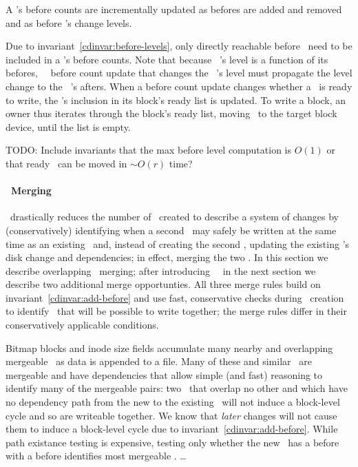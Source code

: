 A \chdesc{}'s before counts are incrementally updated
%
as befores are added and removed
%
and as before \chdesc{}'s change levels.
%

Due to invariant~\ref{cdinvar:before-levels}, only directly reachable
before \chdescs\ need to be included in a \chdesc's before counts.
%
Note that because \anoop\ \chdesc's level is a function of its befores,
%
\anoop\ \chdesc\ before count update that changes the \noop\ \chdesc's level
must propagate the level change to the \noop\ \chdesc's afters.
%
When a before count update changes whether a \chdesc\ is ready to
write, the \chdesc's inclusion in its block's ready list is updated.
%
To write a block, an owner thus iterates through the block's ready
list, moving \chdescs\ to the target block device, until the list is
empty.

TODO: Include invariants that the max before level computation is
$O(1)$ or that ready \chdescs\ can be moved in $\sim\! O(r)$ time?

\paragraph{\ChDesc\ Merging}
\Kudos\ drastically reduces the number of \chdescs\ created to
describe a system of changes by (conservatively) identifying when a
second \chdesc\ may safely be written at the same time as an existing
\chdesc\ and, instead of creating the second \chdesc, updating the
existing \chdesc's disk change and dependencies; in effect, merging
the two \chdescs.
%
In this section we describe overlapping \chdesc\ merging; after
introducing \nrb\ \chdescs\ in the next section we describe
two additional merge opportunties.
%
All three merge rules build on invariant~\ref{cdinvar:add-before}
and use fast, conservative checks during \chdesc\ creation to identify
\chdescs\ that will be possible to write together;
%
the merge rules differ in their conservatively applicable conditions.

Bitmap blocks and inode size fields accumulate many nearby and
overlapping mergeable \chdescs\ as data is appended to a file.
%
Many of these and similar \chdescs\ are mergeable and have
dependencies that allow simple (and fast) reasoning to identify many
of the mergeable pairs: two \chdescs\ that overlap no other \chdescs{}
and which have no dependency path from the new to the existing \chdesc\
will not induce a block-level cycle and so are writeable together.
We know that \textit{later} changes will not cause them to induce a block-level cycle due to
invariant~\ref{cdinvar:add-before}.
%
While path existance testing is expensive, testing only whether the new
\chdesc\ has a before with a before identifies most mergeable
\chdescs. \ldots

